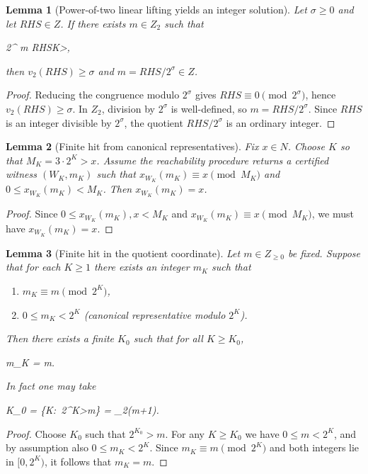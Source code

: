 \documentclass[11pt,letterpaper]{amsart}
\def\mathrm#1{#1}%
\def\mathbb#1{#1}%
\def\[{ }%
\def\]{ }%
\theoremstyle{definition}
\theoremstyle{plain}
\newtheorem{lemma}{Lemma}
\theoremstyle{plain}
\theoremstyle{remark}
\begin{document}
\begin{lemma}[Power-of-two linear lifting yields an integer solution]
\label{lem:pow2-integer}
Let $\sigma\ge 0$ and let $\mathrm{RHS}\in\mathbb Z$. If there exists $m\in\mathbb Z_2$ such that
\[
2^{\sigma} m \equiv \mathrm{RHS}\quad{}K>\sigma,
\]
then $v_2(\mathrm{RHS})\ge \sigma$ and $m=\mathrm{RHS}/2^{\sigma}\in\mathbb Z$.
\end{lemma}

\begin{proof}
Reducing the congruence modulo $2^{\sigma}$ gives $\mathrm{RHS}\equiv 0\pmod{2^{\sigma}}$, hence
$v_2(\mathrm{RHS})\ge \sigma$. In $\mathbb Z_2$, division by $2^{\sigma}$ is well-defined, so
$m=\mathrm{RHS}/2^{\sigma}$. Since $\mathrm{RHS}$ is an integer divisible by $2^{\sigma}$, the quotient
$\mathrm{RHS}/2^{\sigma}$ is an ordinary integer.
\end{proof}

\begin{lemma}[Finite hit from canonical representatives]
\label{lem:finite-hit}
Fix $x\in\mathbb N$. Choose $K$ so that $M_K=3\cdot 2^K > x$.
Assume the reachability procedure returns a certified witness $(W_K,m_K)$ such that
$x_{W_K}(m_K)\equiv x \pmod{M_K}$ and $0\le x_{W_K}(m_K) < M_K$.
Then $x_{W_K}(m_K)=x$.
\end{lemma}

\begin{proof}
Since $0\le x_{W_K}(m_K),x<M_K$ and $x_{W_K}(m_K)\equiv x\pmod{M_K}$, we must have
$x_{W_K}(m_K)=x$.
\end{proof}

\begin{lemma}[Finite hit in the quotient coordinate]
\label{lem:finite-hit-quotient}
Let $m\in\mathbb Z_{\ge 0}$ be fixed. Suppose that for each $K\ge 1$ there exists
an integer $m_K$ such that
\begin{enumerate}
\item $m_K \equiv m \pmod{2^K}$,
\item $0\le m_K < 2^K$ \quad (canonical representative modulo $2^K$).
\end{enumerate}
Then there exists a \emph{finite} $K_0$ such that for all $K\ge K_0$,
\[
m_K = m.
\]
In fact one may take
\[
K_0 \;=\; \min\{K:\ 2^K>m\} \;=\; \left\lceil \log_2(m+1)\right\rceil .
\]
\end{lemma}

\begin{proof}
Choose $K_0$ such that $2^{K_0}>m$. For any $K\ge K_0$ we have $0\le m<2^K$, and by
assumption also $0\le m_K<2^K$. Since $m_K\equiv m\pmod{2^K}$ and both integers lie in
$[0,2^K)$, it follows that $m_K=m$.
\end{proof}
\end{document}
